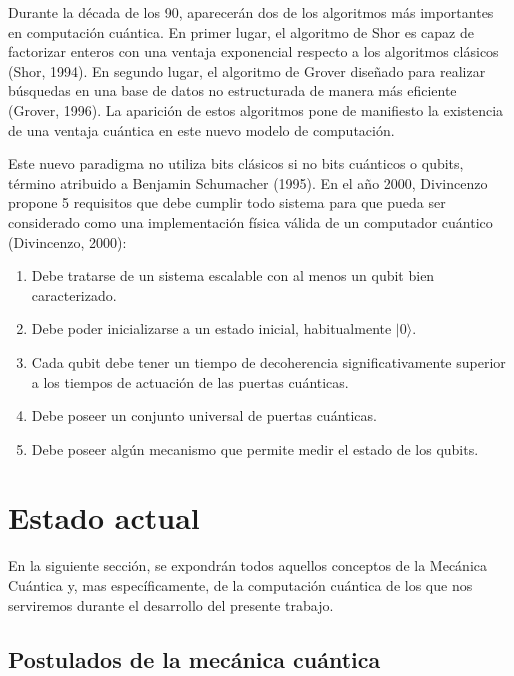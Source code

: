 Durante la década de los 90, aparecerán dos de los algoritmos más importantes en computación cuántica. En primer lugar, el algoritmo de Shor es capaz de factorizar enteros con una ventaja exponencial respecto a los algoritmos clásicos (Shor, 1994). En segundo lugar, el algoritmo de Grover diseñado para realizar búsquedas en una base de datos no estructurada de manera más eficiente (Grover, 1996). La aparición de estos algoritmos pone de manifiesto la existencia de una ventaja cuántica en este nuevo modelo de computación.

Este nuevo paradigma no utiliza bits clásicos  si no bits cuánticos o qubits, término atribuido a Benjamin Schumacher (1995). En el año 2000, Divincenzo propone 5 requisitos que debe cumplir todo sistema para que pueda ser considerado como una implementación física válida de un computador cuántico (Divincenzo, 2000):

\begin{enumerate}
    \item Debe tratarse de un sistema escalable con al menos un qubit bien caracterizado.
    \item Debe poder inicializarse a un estado inicial, habitualmente 
    $ | 0 \rangle $.
    \item Cada qubit debe tener un tiempo de decoherencia significativamente superior a los tiempos de actuación de las puertas cuánticas.
    \item Debe poseer un conjunto universal de puertas cuánticas.
    \item Debe poseer algún mecanismo que permite medir el estado de los qubits.
\end{enumerate}










\section{Estado actual}

En la siguiente sección, se expondrán todos aquellos conceptos de la Mecánica Cuántica y, mas específicamente, de la computación cuántica de los que nos serviremos durante el desarrollo del presente trabajo.

\subsection{Postulados de la mecánica cuántica}

